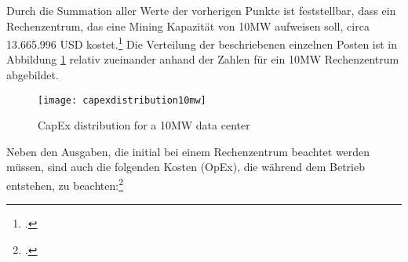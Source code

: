 Durch die Summation aller Werte der vorherigen Punkte ist feststellbar, dass ein Rechenzentrum, das eine Mining Kapazität
von 10MW aufweisen soll, circa 13.665.996 USD kostet.\footcite[Cf.][]{appendix:summaryofinvestment} Die Verteilung der
beschriebenen einzelnen Posten ist in Abbildung \ref{figure:capexdistribution10mw} relativ zueinander anhand der Zahlen für
ein 10MW Rechenzentrum abgebildet.

\begin{figure}[H]
    \caption{CapEx distribution for a 10MW data center}
    \texttt{[image: capexdistribution10mw]}
    \label{figure:capexdistribution10mw}
\end{figure}

Neben den Ausgaben, die initial bei einem Rechenzentrum beachtet werden müssen, sind auch die folgenden Kosten (\ac{OpEx}),
die während dem Betrieb entstehen, zu beachten:\footcite[Cf.][]{appendix:opex}
